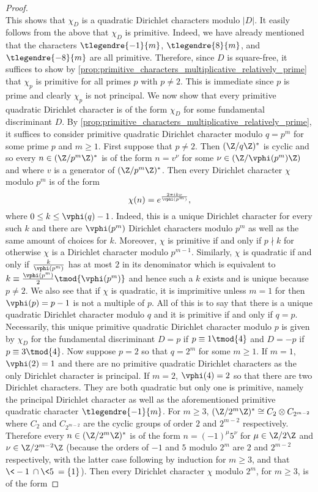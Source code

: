 \begin{proof}
\[        \]
        This shows that $\chi_{D}$ is a quadratic Dirichlet characters modulo $|D|$. It easily follows from the above that $\chi_{D}$ is primitive. Indeed, we have already mentioned that the characters $\tlegendre{-1}{m}$, $\tlegendre{8}{m}$, and $\tlegendre{-8}{m}$ are all primitive. Therefore, since $D$ is square-free, it suffices to show by \cref{prop:primitive_characters_multiplicative_relatively_prime} that $\chi_{p}$ is primitive for all primes $p$ with $p \neq 2$. This is immediate since $p$ is prime and clearly $\chi_{p}$ is not principal. We now show that every primitive quadratic Dirichlet character is of the form $\chi_{D}$ for some fundamental discriminant $D$. By \cref{prop:primitive_characters_multiplicative_relatively_prime}, it suffices to consider primitive quadratic Dirichlet character modulo $q = p^{m}$ for some prime $p$ and $m \ge 1$. First suppose that $p \neq 2$. Then $(\Z/q\Z)^{\ast}$ is cyclic and so every $n \in (\Z/p^{m}\Z)^{\ast}$ is of the form $n = v^{\nu}$ for some $\nu \in (\Z/\vphi(p^{m})\Z)$ and where $v$ is a generator of $(\Z/p^{m}\Z)^{\ast}$. Then every Dirichlet character $\chi$ modulo $p^{m}$ is of the form
        \[
          \chi(n) = e^{\frac{2\pi ik\nu}{\vphi(p^{m})}},
        \]
        where $0 \le k \le \vphi(q)-1$. Indeed, this is a unique Dirichlet character for every such $k$ and there are $\vphi(p^{m})$ Dirichlet characters modulo $p^{m}$ as well as the same amount of choices for $k$. Moreover, $\chi$ is primitive if and only if $p \nmid k$ for otherwise $\chi$ is a Dirichlet character modulo $p^{m-1}$. Similarly, $\chi$ is quadratic if and only if $\frac{k}{\vphi(p^{m})}$ has at most $2$ in its denominator which is equivalent to $k \equiv \frac{\vphi(p^{m})}{2} \tmod{\vphi(p^{m})}$ and hence such a $k$ exists and is unique because $p \neq 2$. We also see that if $\chi$ is quadratic, it is imprimitive unless $m = 1$ for then $\vphi(p) = p-1$ is not a multiple of $p$. All of this is to say that there is a unique quadratic Dirichlet character modulo $q$ and it is primitive if and only if $q = p$. Necessarily, this unique primitive quadratic Dirichlet character modulo $p$ is given by $\chi_{D}$ for the fundamental discriminant $D = p$ if $p \equiv 1 \tmod{4}$ and $D = -p$ if $p \equiv 3 \tmod{4}$. Now suppose $p = 2$ so that $q = 2^{m}$ for some $m \ge 1$. If $m = 1$, $\vphi(2) = 1$ and there are no primitive quadratic Dirichlet characters as the only Dirichlet character is principal. If $m = 2$, $\vphi(4) = 2$ so that there are two Dirichlet characters. They are both quadratic but only one is primitive, namely the principal Dirichlet character as well as the aforementioned primitive quadratic character $\tlegendre{-1}{m}$. For $m \ge 3$, $(\Z/2^{m}\Z)^{\ast} \cong C_{2} \otimes C_{2^{m-2}}$ where $C_{2}$ and $C_{2^{m-2}}$ are the cyclic groups of order $2$ and $2^{m-2}$ respectively. Therefore every $n \in (\Z/2^{m}\Z)^{\ast}$ is of the form $n = (-1)^{\mu}5^{\nu}$ for $\mu \in \Z/2\Z$ and $\nu \in \Z/2^{m-2}\Z$ (because the orders of $-1$ and $5$ modulo $2^{m}$ are $2$ and $2^{m-2}$ respectively, with the latter case following by induction for $m \ge 3$, and that $\<-1\> \cap \<5\> = \{1\}$). Then every Dirichlet character $\chi$ modulo $2^{m}$, for $m \ge 3$, is of the form

\end{proof}
